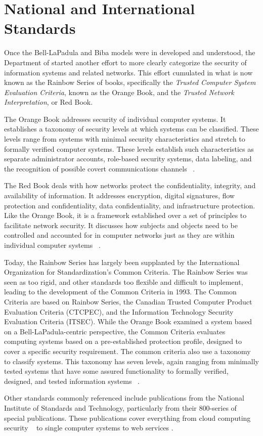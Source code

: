 \section{National and International Standards}
Once the Bell-LaPadula and Biba models were in developed and understood, the Department of  started another effort to more clearly categorize the security of information systems and related networks.  This effort cumulated in what is now known as the Rainbow Series of books, specifically the {\it Trusted Computer System Evaluation Criteria}, known as the Orange Book, and the {\it Trusted Network Interpretation}, or Red Book.

The Orange Book addresses security of individual computer systems.  It establishes a taxonomy of security levels at which systems can be classified.  These levels range from systems with minimal security characteristics and stretch to formally verified computer systems.  These levels establish such characteristics as separate administrator accounts, role-based security systems, data labeling, and the recognition of possible covert communications channels ~\cite{OrangeBook}.

The Red Book deals with how networks protect the confidentiality, integrity, and availability of information.  It addresses encryption, digital signatures, flow protection and confidentiality, data confidentiality, and infrastructure protection.  Like the Orange Book, it is a framework established over a set of principles to facilitate network security.  It discusses how subjects and objects need to be controlled and accounted for in computer networks just as they are within individual computer systems ~\cite{RedBook}.

Today, the Rainbow Series has largely been supplanted by the International Organization for Standardization's Common Criteria.  The Rainbow Series was seen as too rigid, and other standards too flexible and difficult to implement, leading to the development of the Common Criteria in 1993.  The Common Criteria are based on Rainbow Series, the Canadian Trusted Computer Product Evaluation Criteria (CTCPEC), and the Information Technology Security Evaluation Criteria (ITSEC).  While the Orange Book examined a system based on a Bell-LaPadula-centric perspective, the Common Criteria evaluates computing systems based on a pre-established protection profile, designed to cover a specific security requirement.  The common criteria also use a taxonomy to classify systems.  This taxonomy has seven levels, again ranging from minimally tested systems that have some assured functionality to formally verified, designed, and tested information systems ~\cite{CommonCriteria}.

Other standards commonly referenced include publications from the National Institute of Standards and Technology, particularly from their 800-series of special publications.  These publications cover everything from cloud computing security ~\cite{NIST800:144} to single computer systems \cite{NIST800:12} to web services \cite{NIST800:95}.
